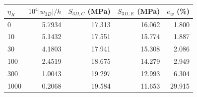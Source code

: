 \begin{tabularx}{\linewidth}{Xrrrr}
\toprule
$\eta_R$ & $10^4|w_{3D}|/h$ & $S_{3D,C}$ (MPa) & $S_{3D,E}$ (MPa) & $e_w$ (\%) \\
\midrule
0 & 5.7934 & 17.313 & 16.062 & 1.800 \\
10 & 5.1432 & 17.551 & 15.774 & 1.887 \\
30 & 4.1803 & 17.941 & 15.308 & 2.086 \\
100 & 2.4519 & 18.675 & 14.279 & 2.949 \\
300 & 1.0043 & 19.297 & 12.993 & 6.304 \\
1000 & 0.2068 & 19.584 & 11.653 & 29.915 \\
\bottomrule
\end{tabularx}
